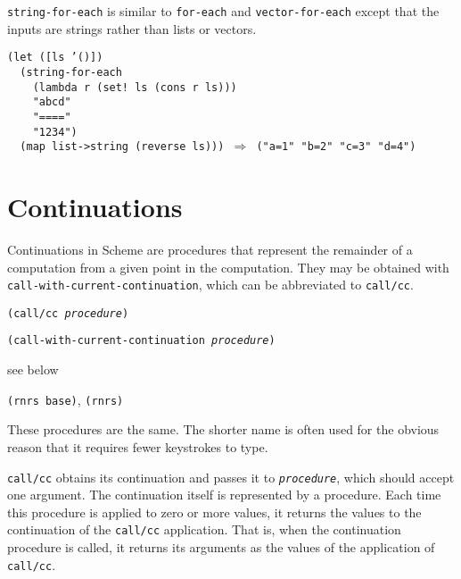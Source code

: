 \label{control_s51}\label{control_s52}\texttt{string-for-each} is similar to
\texttt{for-each} and \texttt{vector-for-each}
except that the inputs are strings rather than lists or vectors.


\begin{alltt}
(let ([ls '()])
  (string-for-each
    (lambda r (set! ls (cons r ls)))
    "abcd"
    "===="
    "1234")
  (map list-\textgreater{}string (reverse ls))) \(\Rightarrow\) ("a=1" "b=2" "c=3" "d=4")
\end{alltt}

\section{\label{control_g102}\label{control_h6}Continuations\label{control_SECTCONTINUATIONS}}



Continuations in Scheme are procedures that represent the remainder
of a computation from a given point in the computation.
They may be obtained with \texttt{call-with-current-continuation}, which
can be abbreviated to \label{control_s53}\texttt{call/cc}.

\begin{description}

\label{control_s54}\item[procedure] \texttt{(call/cc \textit{procedure})}



\item[procedure] \texttt{(call-with-current-continuation \textit{procedure})}



\item[returns] see below


\item[libraries] \texttt{(rnrs base)}, \texttt{(rnrs)}
\end{description}


These procedures are the same.
The shorter name is often used for the obvious reason that it requires
fewer keystrokes to type.

\texttt{call/cc} obtains its continuation and passes it to \texttt{\textit{procedure}},
which should accept one argument.
The continuation itself is represented by a procedure.
Each time this procedure is applied to zero or more values, it returns the values to the
continuation of the \texttt{call/cc} application.
That is, when the continuation procedure is called, it returns its arguments
as the values of the application of \texttt{call/cc}.

